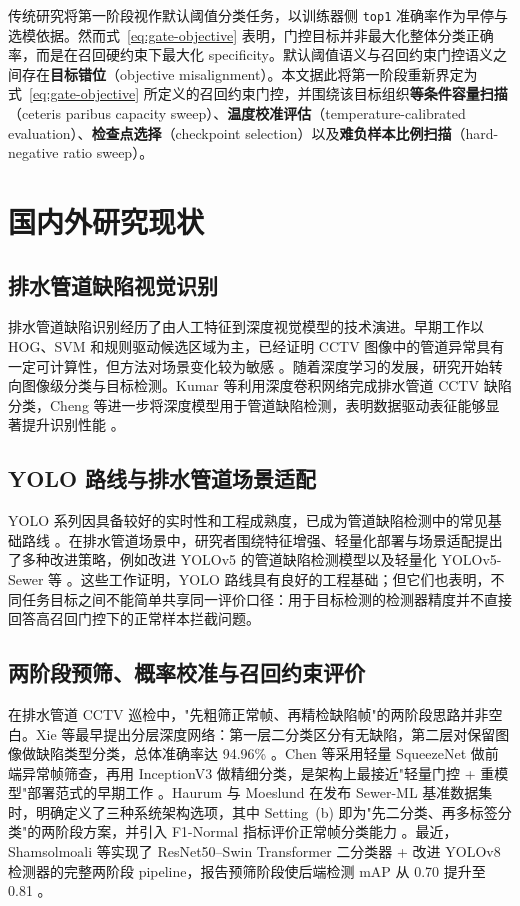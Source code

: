 \documentclass[UTF8,openany,12pt]{ctexbook}
\newcommand{\formalmetric}[1]{\texttt{#1}}
\begin{document}
传统研究将第一阶段视作默认阈值分类任务，以训练器侧 \formalmetric{top1} 准确率作为早停与选模依据。然而式~\eqref{eq:gate-objective} 表明，门控目标并非最大化整体分类正确率，而是在召回硬约束下最大化 specificity。默认阈值语义与召回约束门控语义之间存在\textbf{目标错位}（objective misalignment）。本文据此将第一阶段重新界定为式~\eqref{eq:gate-objective} 所定义的召回约束门控，并围绕该目标组织\textbf{等条件容量扫描}（ceteris paribus capacity sweep）、\textbf{温度校准评估}（temperature-calibrated evaluation）、\textbf{检查点选择}（checkpoint selection）以及\textbf{难负样本比例扫描}（hard-negative ratio sweep）。

\section{国内外研究现状}
\subsection{排水管道缺陷视觉识别}
排水管道缺陷识别经历了由人工特征到深度视觉模型的技术演进。早期工作以 HOG、SVM 和规则驱动候选区域为主，已经证明 CCTV 图像中的管道异常具有一定可计算性，但方法对场景变化较为敏感 \cite{halfawy2014hogsvm}。随着深度学习的发展，研究开始转向图像级分类与目标检测。Kumar 等利用深度卷积网络完成排水管道 CCTV 缺陷分类，Cheng 等进一步将深度模型用于管道缺陷检测，表明数据驱动表征能够显著提升识别性能 \cite{kumar2018cnn,cheng2018deep}。

\subsection{YOLO 路线与排水管道场景适配}
YOLO 系列因具备较好的实时性和工程成熟度，已成为管道缺陷检测中的常见基础路线 \cite{redmon2016yolo}。在排水管道场景中，研究者围绕特征增强、轻量化部署与场景适配提出了多种改进策略，例如改进 YOLOv5 的管道缺陷检测模型以及轻量化 YOLOv5-Sewer 等 \cite{wang2023improvedyolov5,zhao2024yolov5sewer}。这些工作证明，YOLO 路线具有良好的工程基础；但它们也表明，不同任务目标之间不能简单共享同一评价口径：用于目标检测的检测器精度并不直接回答高召回门控下的正常样本拦截问题。

\subsection{两阶段预筛、概率校准与召回约束评价}
在排水管道 CCTV 巡检中，"先粗筛正常帧、再精检缺陷帧"的两阶段思路并非空白。Xie 等最早提出分层深度网络：第一层二分类区分有无缺陷，第二层对保留图像做缺陷类型分类，总体准确率达 94.96\% \cite{xie2019hierarchical}。Chen 等采用轻量 SqueezeNet 做前端异常帧筛查，再用 InceptionV3 做精细分类，是架构上最接近"轻量门控 + 重模型"部署范式的早期工作 \cite{chen2018intelligent}。Haurum 与 Moeslund 在发布 Sewer-ML 基准数据集时，明确定义了三种系统架构选项，其中 Setting~(b) 即为"先二分类、再多标签分类"的两阶段方案，并引入 F1-Normal 指标评价正常帧分类能力 \cite{haurum2021sewerml}。最近，Shamsolmoali 等实现了 ResNet50--Swin Transformer 二分类器 + 改进 YOLOv8 检测器的完整两阶段 pipeline，报告预筛阶段使后端检测 mAP 从 0.70 提升至 0.81 \cite{shamsolmoali2025twostage}。
\end{document}
